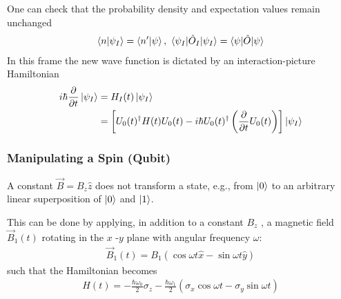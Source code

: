 One can check that the probability density and expectation values remain unchanged
\begin{align*}
    \braket{n|\psi_I}=\braket{n'|\psi},\ \braket{\psi_I|\hat{O}_I|\psi_I}=\braket{\psi|\hat{O}|\psi}
\end{align*}
In this frame the new wave function is dictated by an interaction-picture Hamiltonian
\begin{align*}
    i\hbar\frac{\partial}{\partial t}\ket{\psi_I}&=H_I(t)\ket{\psi_I}\\
    &=\left[ U_0(t)^\dagger H(t)U_0(t)-i\hbar U_0(t)^\dagger \left( \frac{\partial}{\partial t}U_0(t) \right) \right]\ket{\psi_I}
\end{align*}

\subsubsection{Manipulating a Spin (Qubit)}
A constant $\vec{B}=B_z\hat{z}$ does not transform a state, e.g., from $\ket{0}$ to an arbitrary linear superposition of $\ket{0}$ and $\ket{1}$. 

This can be done by applying, in addition to a constant $B_z$ , a magnetic field $\vec{B}_1(t)$ rotating in the $x$ -$y$ plane with angular frequency $\omega$:
\begin{align*}
    \vec{B}_1(t)=B_1(\cos\omega t \hat{x}-\sin\omega t\hat{y})
\end{align*}
such that the Hamiltonian becomes
\begin{align*}
    H(t)=-\frac{\hbar\omega_0}{2}\sigma_z-\frac{\hbar\omega_1}{2}(\sigma_x\cos\omega t-\sigma_y\sin\omega t)
\end{align*}

